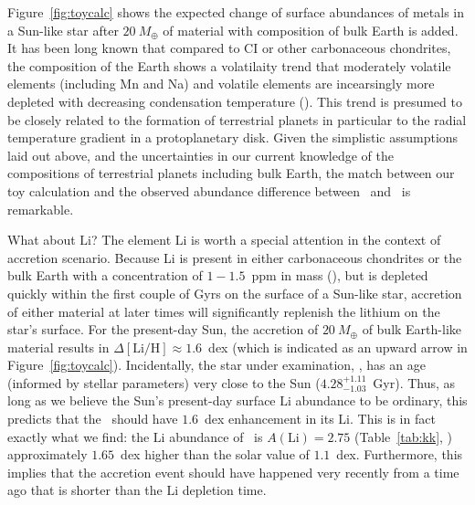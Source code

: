 \documentclass[modern, letterpaper]{aastex61}
\newcommand{\figname}{Figure}
\newcommand*\elem[1]{\ensuremath{\mathrm{#1}}}
\newcommand*\elemH[1]{\ensuremath{[\mathrm{#1}/\elem{H}]}}
\newcommand{\sunanalog}{\text{Krios}}
\newcommand{\bizarreone}{\text{Kronos}}
\newcommand{\mearth}{\ensuremath{M_\oplus}}
\begin{document}
Figure~\ref{fig:toycalc} shows the expected change of surface abundances of
metals in a Sun-like star after $20~\mearth$ of material with composition of
bulk Earth is added.
It has been long known that compared to CI or other carbonaceous chondrites,
the composition of the Earth shows a volatilaity trend that moderately volatile
elements (including Mn and Na) and volatile elements are incearsingly more
depleted with decreasing condensation temperature
(\citealt{mcdonough2001composition}).
This trend is presumed to be closely related to the formation of terrestrial
planets in particular to the radial temperature gradient in a protoplanetary
disk.
Given the simplistic assumptions laid out above, and the uncertainties in our
current knowledge of the compositions of terrestrial planets including bulk
Earth, the match between our toy calculation and the observed abundance
difference between \bizarreone\ and \sunanalog\ is remarkable.


What about \elem{Li}?
The element \elem{Li} is worth a special attention in the context of accretion scenario.
Because Li is present in either carbonaceous chondrites or the bulk Earth with
a concentration of $1-1.5$~ppm in mass (\citealt{mcdonough2001composition}),
but is depleted quickly within the first couple of Gyrs on the surface of a
Sun-like star, accretion of either material at later times will significantly
replenish the lithium on the star's surface.
For the present-day Sun, the accretion of $20~\mearth$ of bulk Earth-like
material results in $\Delta\elemH{Li} \approx 1.6$~dex (which
is indicated as an upward arrow in \figname~\ref{fig:toycalc}).
Incidentally, the star under examination, \bizarreone, has an age (informed by
stellar parameters) very close to the Sun ($4.28_{-1.03}^{+1.11}$~Gyr).
Thus, as long as we believe the Sun's present-day surface \elem{Li} abundance
to be ordinary, this predicts that the \bizarreone\ should have $1.6$~dex enhancement
in its \elem{Li}.
This is in fact exactly what we find: the \elem{Li} abundance of \bizarreone\ is
$A(\elem{Li}) = 2.75$ (Table~\ref{tab:kk}, \citealt{jmlithium})
approximately $1.65$~dex higher than the solar value of $1.1$~dex.
Furthermore, this implies that the accretion event should have happened very
recently from a time ago that is shorter than the \elem{Li} depletion time.

\end{document}
